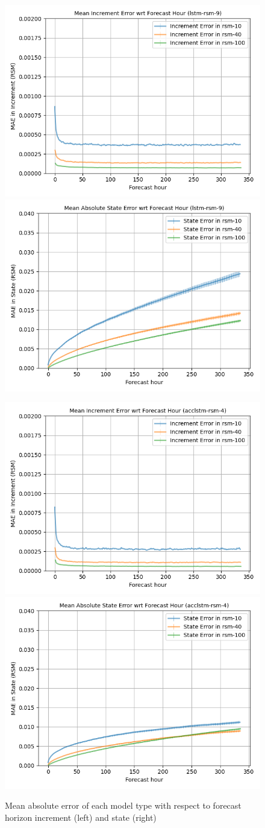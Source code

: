 \begin{figure}[hp!]
    \includegraphics[width=.42\linewidth,draft=false]{figures/horizons/eval_test_lstm-rsm-9_rsm_horizon_na_res.png}
    \includegraphics[width=.42\linewidth,draft=false]{figures/horizons/eval_test_lstm-rsm-9_rsm_horizon_na_state.png}

    \includegraphics[width=.42\linewidth,draft=false]{figures/horizons/eval_test_acclstm-rsm-4_rsm_horizon_na_res.png}
    \includegraphics[width=.42\linewidth,draft=false]{figures/horizons/eval_test_acclstm-rsm-4_rsm_horizon_na_state.png}

    \caption{Mean absolute error of each model type with respect to forecast horizon increment (left) and state (right)}
    \label{best-horizons}
\end{figure}

